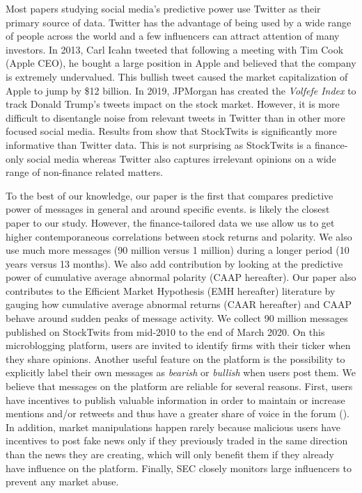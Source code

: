 Most papers studying social media's predictive power use Twitter as their primary source of data. Twitter has the advantage of being used by a wide range of people across the world and a few influencers can attract attention of many investors. In 2013, Carl Icahn tweeted that following a meeting with Tim Cook (Apple CEO), he bought a large position in Apple and believed that the company is extremely undervalued. This bullish tweet caused the market capitalization of Apple to jump by \$12 billion. In 2019, JPMorgan has created the \textit{Volfefe Index} to track Donald Trump's tweets impact on the stock market. However, it is more difficult to disentangle noise from relevant tweets in Twitter than in other more focused social media. Results from \citet{Ghoshal} show that StockTwits is significantly more informative than Twitter data. This is not surprising as StockTwits is a finance-only social media whereas Twitter also captures irrelevant opinions on a wide range of non-finance related matters.

To the best of our knowledge, our paper is the first that compares predictive power of messages in general and around specific events. \citet{ranco2015effects} is likely the closest paper to our study. However, the finance-tailored data we use allow us to get higher contemporaneous correlations between stock returns and polarity. We also use much more messages (90 million versus 1 million) during a longer period (10 years versus 13 months). We also add contribution by looking at the predictive power of cumulative average abnormal polarity (CAAP hereafter). Our paper also contributes to the Efficient Market Hypothesis (EMH hereafter) literature by gauging how cumulative average abnormal returns (CAAR hereafter) and CAAP behave around sudden peaks of message activity. We collect 90 million messages published on StockTwits from mid-2010 to the end of March 2020. On this microblogging platform, users are invited to identify firms with their ticker when they share opinions. Another useful feature on the platform is the possibility to explicitly label their own messages as \textit{bearish} or \textit{bullish} when users post them. We believe that messages on the platform are reliable for several reasons. First, users have incentives to publish valuable information in order to maintain or increase mentions and/or retweets and thus have a greater share of voice in the forum (\citet{sprenger2014tweets}). In addition, market manipulations happen rarely because malicious users have incentives to post fake news only if they previously traded in the same direction than the news they are creating, which will only benefit them if they already have influence on the platform. Finally, SEC closely monitors large influencers to prevent any market abuse. 

